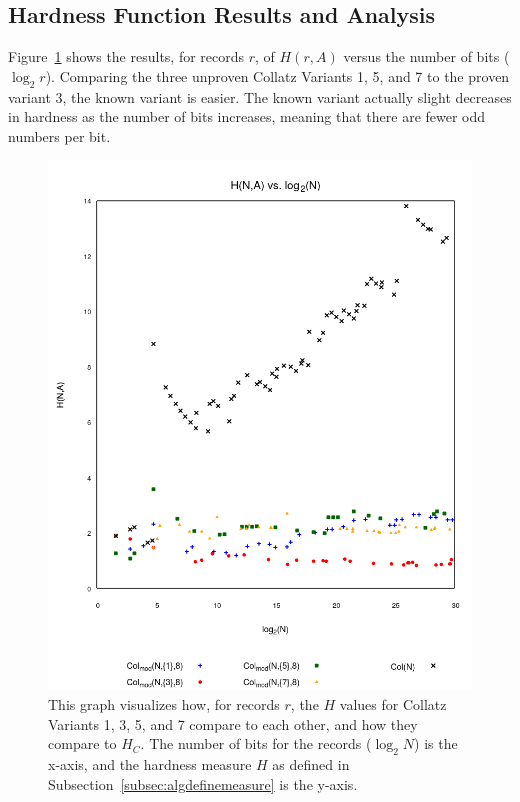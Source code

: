 \subsection{Hardness Function Results and Analysis} \label{subsubsec:algsinhardness}
Figure~\ref{fig:hvslog} shows the results, for records $r$, of $H(r,A)$ versus the number of bits ($\log_2{r}$). Comparing the three unproven Collatz Variants 1, 5, and 7 to the proven variant 3, the known variant is easier. The known variant actually slight decreases in hardness as the number of bits increases, meaning that there are fewer odd numbers per bit. \par
\begin{figure}
    \centering
    \includegraphics[scale=0.6]{ModAvoidanceAnalysisPics/H_vs_log.png}
    \caption{This graph visualizes how, for records $r$, the $H$ values for Collatz Variants 1, 3, 5, and 7 compare to each other, and how they compare to $H_C$. The number of bits for the records ($\log_2{N}$) is the x-axis, and the hardness measure $H$ as defined in Subsection~\ref{subsec:algdefinemeasure} is the y-axis.}
    \label{fig:hvslog}
\end{figure}

